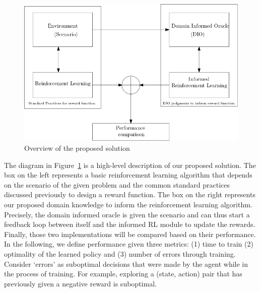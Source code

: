 \begin{figure}[H]
  \centering
  \includegraphics[scale=0.45]{figures/overview.png}
  \caption{Overview of the proposed solution}
  \label{fig:overview}
\end{figure}

The diagram in Figure~\ref{fig:overview} is a high-level description of our proposed solution. 
%
The box on the left represents a basic reinforcement learning algorithm that depends on the scenario of the given problem and 
the common standard practices discussed previously to design a reward function. 
%
The box on the right represents our proposed domain knowledge to inform the reinforcement learning algorithm. 
Precisely, the domain informed oracle is given the scenario and can thus start a feedback loop between itself and 
the informed RL module to update the rewards. 
%
Finally, those two implementations will be compared based on their performance. In the following, we define performance 
given three metrics: (1) time to train (2) optimality of the learned policy and (3) number of errors through training. 
Consider `errors' as suboptimal decisions that were made by the agent while in the process of training. For example, exploring a (state, action) pair 
that has previously given a negative reward is suboptimal. 
